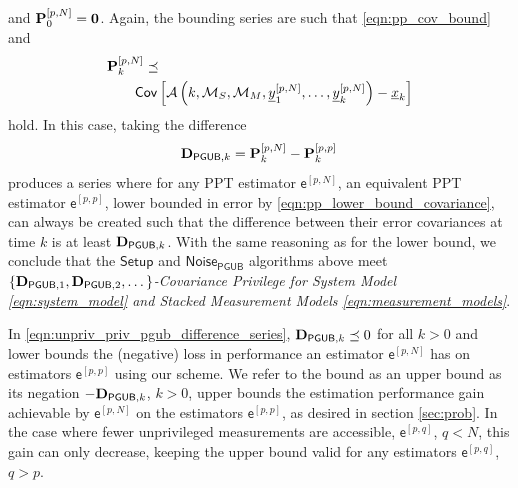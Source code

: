 \documentclass[letterpaper, 10 pt, conference]{ieeeconf}
\begin{document}
and ${{\mathbf{P}}}_0^{[p,N]} = {{\mathbf{0}}}$. Again, the bounding series are such that \eqref{eqn:pp_cov_bound} and
\begin{equation}\label{eqn:pN_cov_bound}
  \begin{split}
    &{{\mathbf{P}}}_k^{[p,N]} \preceq\\
    &\qquad \mathsf{Cov}\left[\mathcal{A}\left(k,\mathcal{M}_S,\mathcal{M}_M,{\underline{y}}_1^{[p,N]},\dots,{\underline{y}}_k^{[p,N]}\right) - {\underline{x}}_k\right]
  \end{split}
\end{equation}
hold. In this case, taking the difference
\begin{equation}\label{eqn:unpriv_priv_pgub_difference_series}
  {\ensuremath{{\mathbf{D}}}}_{\mathsf{PGUB},k} = {{\mathbf{P}}}_k^{[p,N]} - {{\mathbf{P}}}_k^{[p,p]}\,
\end{equation}
produces a series where for any PPT estimator $\mathsf{e}^{[p,N]}$, an equivalent PPT estimator $\mathsf{e}^{[p,p]}$, lower bounded in error by \eqref{eqn:pp_lower_bound_covariance}, can always be created such that the difference between their error covariances at time $k$ is at least ${{\mathbf{D}}}_{\mathsf{PGUB},k}$. With the same reasoning as for the lower bound, we conclude that the $\mathsf{Setup}$ and $\mathsf{Noise}_{\mathsf{PGUB}}$ algorithms above meet \textit{$\{{{\mathbf{D}}}_{\mathsf{PGUB},1},{{\mathbf{D}}}_{\mathsf{PGUB},2},\dots\}$-Covariance Privilege for System Model \eqref{eqn:system_model} and Stacked Measurement Models \eqref{eqn:measurement_models}}.

In \eqref{eqn:unpriv_priv_pgub_difference_series}, ${{\mathbf{D}}}_{\mathsf{PGUB},k} \preceq 0$ for all $k>0$ and lower bounds the (negative) loss in performance an estimator $\mathsf{e}^{[p,N]}$ has on estimators $\mathsf{e}^{[p,p]}$ using our scheme. We refer to the bound as an upper bound as its negation $-{{\mathbf{D}}}_{\mathsf{PGUB},k}$, $k>0$, upper bounds the estimation performance gain achievable by $\mathsf{e}^{[p,N]}$ on the estimators $\mathsf{e}^{[p,p]}$, as desired in section \ref{sec:prob}. In the case where fewer unprivileged measurements are accessible, $\mathsf{e}^{[p,q]}$, $q<N$, this gain can only decrease, keeping the upper bound valid for any estimators $\mathsf{e}^{[p,q]}$, $q>p$.

% 
%                                 
%                                 
%                                 
% 
\end{document}
